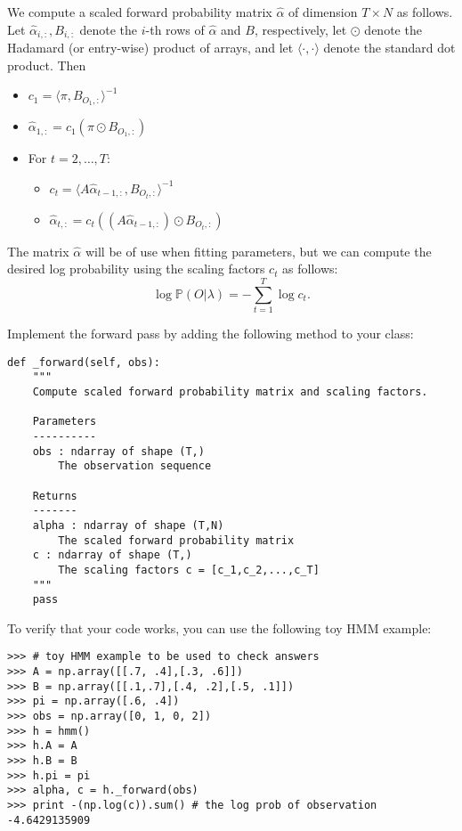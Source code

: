 We compute a scaled forward probability matrix $\widehat{\alpha}$ of dimension $T \times N$ as follows.
Let $\widehat{\alpha}_{i,:}, B_{i,:}$ denote the $i$-th rows of $\widehat{\alpha}$ and $B$, respectively, let $\odot$ denote the Hadamard (or entry-wise) product of arrays,
and let $\langle \cdot, \cdot \rangle$ denote the standard dot product.
Then
\begin{itemize}
 \item $c_1 = \langle \pi, B_{O_1,:}\rangle^{-1}$
 \item $\widehat{\alpha}_{1,:} = c_1(\pi\odot B_{O_1,:})$
 \item For $t = 2, \ldots, T$:
 \begin{itemize}[]
     \item $c_t = \langle A\widehat{\alpha}_{t-1,:}, B_{O_t,:}\rangle^{-1}$
	 \item $\widehat{\alpha}_{t,:} = c_t((A\widehat{\alpha}_{t-1,:})\odot B_{O_t,:})$
 \end{itemize}
\end{itemize}
The matrix $\widehat{\alpha}$ will be of use when fitting parameters, but we can compute the desired log probability using the scaling factors $c_t$ as follows:
\[
\log \mathbb{P}(O | \lambda) = -\sum_{t=1}^T \log c_t.
\]

\begin{problem}
Implement the forward pass by adding the following method to your class:
\begin{lstlisting}
def _forward(self, obs):
    """
    Compute scaled forward probability matrix and scaling factors.

    Parameters
    ----------
    obs : ndarray of shape (T,)
        The observation sequence

    Returns
    -------
    alpha : ndarray of shape (T,N)
        The scaled forward probability matrix
    c : ndarray of shape (T,)
        The scaling factors c = [c_1,c_2,...,c_T]
    """
    pass
\end{lstlisting}
To verify that your code works, you can use the following toy HMM example:
\begin{lstlisting}
>>> # toy HMM example to be used to check answers
>>> A = np.array([[.7, .4],[.3, .6]])
>>> B = np.array([[.1,.7],[.4, .2],[.5, .1]])
>>> pi = np.array([.6, .4])
>>> obs = np.array([0, 1, 0, 2])
>>> h = hmm()
>>> h.A = A
>>> h.B = B
>>> h.pi = pi
>>> alpha, c = h._forward(obs)
>>> print -(np.log(c)).sum() # the log prob of observation
-4.6429135909
\end{lstlisting}
\end{problem}


